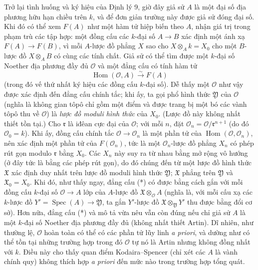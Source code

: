 Trở lại tình huống và ký hiệu của Định lý 9, giờ đây giả sử $A$ là một đại số
địa phương hữu hạn chiều trên $k$, và để đơn giản trường này được giả sử đóng đại số.
Khi đó có thể xem $F(A)$ như một hàm tử hiệp biến theo $A$, nhận giá trị trong
phạm trù các tập hợp: một đồng cấu các $k$-đại số $A\longrightarrow B$ xác
định một ánh xạ $F(A)\longrightarrow F(B)$, vì mỗi $A$-lược đồ phẳng $X$ sao
cho $X\otimes_A k=X_0$ cho một $B$-lược đồ $X\otimes_A B$ có cùng các tính
chất. Giả sử có thể tìm được một $k$-đại số Noether địa phương đầy đủ
$\mathcal O$ và một đẳng cấu có tính hàm tử
\begin{equation}
  \tag{*}
  \operatorname{Hom}(\mathcal O,A)\xrightarrow{\sim}F(A)
\end{equation}
(trong đó vế thứ nhất ký hiệu các đồng cấu $k$-đại số). Dễ thấy một
$\mathcal O$ như vậy được xác định đến đẳng cấu chính tắc; khi ấy, ta gọi phổ
hình thức $\mathfrak Y$ của $\mathcal O$ (nghĩa là không gian tôpô chỉ gồm
một điểm và được trang bị một bó các vành tôpô thu về $\mathcal O$) là
\emph{lược đồ moduli hình thức} của $X_0$. (Lược đồ này không nhất thiết tồn
tại.) Cho $\mathfrak r$ là iđêan cực đại của $\mathcal O$; với mỗi $n$, đặt
$\mathcal O_n=\mathcal O/\mathfrak r^{n+1}$ (do đó $\mathcal O_0=k$). Khi
ấy, đồng cấu chính tắc $\mathcal O\longrightarrow\mathcal O_n$ là một phần tử
của $\operatorname{Hom}(\mathcal O,\mathcal O_n)$, nên xác định một phần tử
của $F(\mathcal O_n)$, tức là một $\mathcal O_n$-lược đồ phẳng $X_n$ có phép
rút gọn modulo $\mathfrak r$ bằng $X_0$. Các $X_n$ này suy ra từ nhau bằng
mở rộng vô hướng (ở đây tức là bằng các phép rút gọn), do đó chúng đến từ một
lược đồ hình thức $\mathfrak X$ xác định duy nhất trên lược đồ moduli hình
thức $\mathfrak Y$; $\mathfrak X$ phẳng trên $\mathfrak Y$ và
$\mathfrak X_0=X_0$. Khi đó, như thấy ngay, đẳng cấu (*) có được bằng cách
gắn với mỗi đồng cấu $k$-đại số $\mathcal O\longrightarrow A$ lớp của
$A$-lược đồ $\mathfrak X\otimes_{\mathcal O}A$ (nghĩa là, với mỗi cấu xạ các
$k$-lược đồ $Y'=\operatorname{Spec}(A)\longrightarrow\mathfrak Y$, ta gắn
$Y'$-lược đồ $\mathfrak X\otimes_{\mathfrak Y}Y'$ thu được bằng đổi cơ sở).
Hơn nữa, đẳng cấu (*) và mô tả vừa nêu vẫn còn đúng nếu chỉ giả sử $A$ là một
$k$-đại số Noether địa phương đầy đủ (không nhất thiết Artin). Dĩ nhiên, như
thường lệ, $\mathcal O$ hoàn toàn có thể có các phần tử lũy linh
\textit{a priori}, và dường như có thể tồn tại những trường hợp trong đó
$\mathcal O$ tự nó là Artin nhưng không đồng nhất với $k$. Điều này cho thấy
quan điểm Kodaira--Spencer (chỉ xét các $A$ là vành chính quy) không thích hợp
\textit{a priori} đến mức nào trong trường hợp tổng quát.

